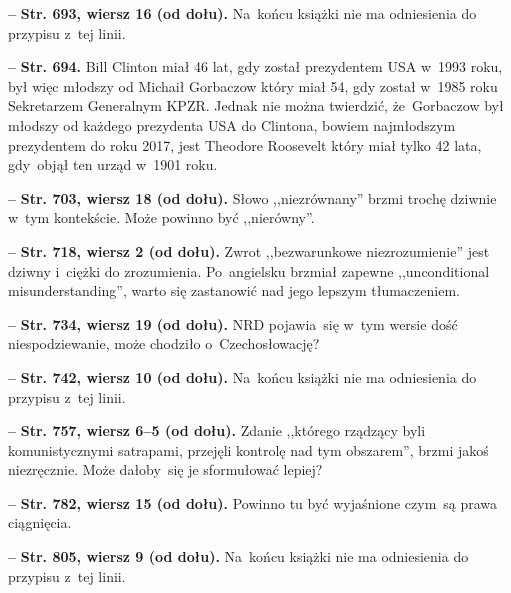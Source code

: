 \documentclass[a4paper,11pt]{article}  %
\newcommand{\spaceFour}{0.5em}
\newcommand{\tb}{\textbf}
\newcommand{\noi}{\noindent}
\newcommand{\start}{\noi \tb{--} {}}
\newcommand{\Str}[1]{\tb{Str. #1.}}
\newcommand{\StrWd}[2]{\tb{Str. #1, wiersz #2 (od dołu).}}
\begin{document}
\vspace{\spaceFour}


\start \StrWd{693}{16} Na~końcu książki nie ma odniesienia do przypisu
z~tej linii.

\vspace{\spaceFour}


\start \Str{694} Bill Clinton miał 46 lat, gdy został prezydentem USA
w~1993 roku, był więc młodszy od Michaił Gorbaczow który miał 54, gdy
został w~1985 roku Sekretarzem Generalnym KPZR. Jednak nie można
twierdzić, że~Gorbaczow był młodszy od każdego prezydenta USA do
Clintona, bowiem najmłodszym prezydentem do roku 2017, jest Theodore
Roosevelt który miał tylko 42 lata, gdy~objął ten urząd w~1901 roku.

\vspace{\spaceFour}


\start \StrWd{703}{18} Słowo ,,niezrównany'' brzmi trochę dziwnie
w~tym kontekście. Może powinno być ,,nierówny''.

\vspace{\spaceFour}


\start \StrWd{718}{2} Zwrot ,,bezwarunkowe niezrozumienie'' jest
dziwny i~ciężki do zrozumienia. Po~angielsku brzmiał zapewne
,,unconditional misunderstanding'', warto się zastanowić nad jego
lepszym tłumaczeniem.

\vspace{\spaceFour}


\start \StrWd{734}{19} NRD pojawia~się w~tym wersie dość
niespodziewanie, może chodziło o~Czechosłowację?

\vspace{\spaceFour}


\start \StrWd{742}{10} Na~końcu książki nie ma odniesienia do przypisu
z~tej linii.

\vspace{\spaceFour}


\start \StrWd{757}{6--5} Zdanie ,,którego rządzący byli
komunistycznymi satrapami, przejęli kontrolę nad tym obszarem'', brzmi
jakoś niezręcznie. Może dałoby~się je sformułować lepiej?

\vspace{\spaceFour}


\start \StrWd{782}{15} Powinno tu być wyjaśnione czym~są prawa
ciągnięcia.

\vspace{\spaceFour}


\start \StrWd{805}{9} Na~końcu książki nie ma odniesienia do przypisu
z~tej linii.
\end{document}
